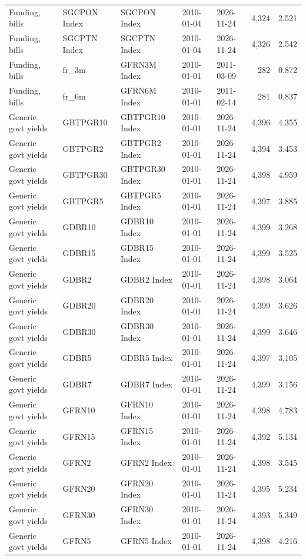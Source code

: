 \documentclass[10pt,a4paper]{article}
\begin{document}
{\begin{longtable}{lllllrr}
Funding, bills & SGCPON Index & SGCPON Index & 2010-01-04 & 2026-11-24 & 4,324 & 2.521 \\
Funding, bills & SGCPTN Index & SGCPTN Index & 2010-01-04 & 2026-11-24 & 4,326 & 2.542 \\
Funding, bills & fr\_3m & GFRN3M Index & 2010-01-01 & 2011-03-09 & 282 & 0.872 \\
Funding, bills & fr\_6m & GFRN6M Index & 2010-01-01 & 2011-02-14 & 281 & 0.837 \\
Generic govt yields & GBTPGR10 & GBTPGR10 Index & 2010-01-01 & 2026-11-24 & 4,396 & 4.355 \\
Generic govt yields & GBTPGR2 & GBTPGR2 Index & 2010-01-01 & 2026-11-24 & 4,394 & 3.453 \\
Generic govt yields & GBTPGR30 & GBTPGR30 Index & 2010-01-01 & 2026-11-24 & 4,398 & 4.959 \\
Generic govt yields & GBTPGR5 & GBTPGR5 Index & 2010-01-01 & 2026-11-24 & 4,397 & 3.885 \\
Generic govt yields & GDBR10 & GDBR10 Index & 2010-01-01 & 2026-11-24 & 4,399 & 3.268 \\
Generic govt yields & GDBR15 & GDBR15 Index & 2010-01-01 & 2026-11-24 & 4,399 & 3.525 \\
Generic govt yields & GDBR2 & GDBR2 Index & 2010-01-01 & 2026-11-24 & 4,398 & 3.064 \\
Generic govt yields & GDBR20 & GDBR20 Index & 2010-01-01 & 2026-11-24 & 4,399 & 3.626 \\
Generic govt yields & GDBR30 & GDBR30 Index & 2010-01-01 & 2026-11-24 & 4,399 & 3.646 \\
Generic govt yields & GDBR5 & GDBR5 Index & 2010-01-01 & 2026-11-24 & 4,397 & 3.105 \\
Generic govt yields & GDBR7 & GDBR7 Index & 2010-01-01 & 2026-11-24 & 4,399 & 3.156 \\
Generic govt yields & GFRN10 & GFRN10 Index & 2010-01-01 & 2026-11-24 & 4,398 & 4.783 \\
Generic govt yields & GFRN15 & GFRN15 Index & 2010-01-01 & 2026-11-24 & 4,392 & 5.134 \\
Generic govt yields & GFRN2 & GFRN2 Index & 2010-01-01 & 2026-11-24 & 4,398 & 3.545 \\
Generic govt yields & GFRN20 & GFRN20 Index & 2010-01-01 & 2026-11-24 & 4,395 & 5.234 \\
Generic govt yields & GFRN30 & GFRN30 Index & 2010-01-01 & 2026-11-24 & 4,393 & 5.349 \\
Generic govt yields & GFRN5 & GFRN5 Index & 2010-01-01 & 2026-11-24 & 4,398 & 4.216 \\

\end{longtable}}
\end{document}
